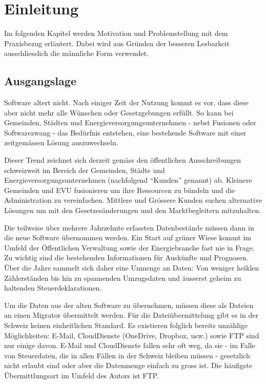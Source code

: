\chapter{Einleitung}
Im folgenden Kapitel werden Motivation und Problemstellung mit dem Praxisbezug erläutert. 
Dabei wird aus Gründen der besseren Lesbarkeit ausschliesslich 
die männliche Form verwendet.

\section{Ausgangslage}
Software altert nicht. Nach einiger Zeit der Nutzung kommt es vor, dass diese aber nicht mehr alle Wünschen oder Gesetzgebungen erfüllt.
So kann bei Gemeinden, Städten und Energieversorgungsunternehmen - nebst Fusionen oder Softwarezwang - das Bedürfnis entstehen, 
eine bestehende Software mit einer zeitgemässen Lösung auszuwechseln.   

Dieser Trend zeichnet sich derzeit gemäss den öffentlichen Ausschreibungen schweizweit im Bereich der Gemeinden, Städte und Energieversorgungsunternehmen 
(nachfolgend ``Kunden'' genannt) ab. 
Kleinere Gemeinden und EVU fusionieren um ihre Ressourcen zu bündeln und die Administration zu vereinfachen. 
Mittlere und Grössere Kunden suchen alternative Lösungen um mit den Gesetzesänderungen und den Marktbegleitern mitzuhalten.  

Die teilweise über mehrere Jahrzehnte erfassten Datenbestände müssen dann in die neue Software übernommen werden. 
Ein Start auf grüner Wiese kommt im Umfeld der Öffentlichen Verwaltung sowie der Energiebranche fast nie in Frage. 
Zu wichtig sind die bestehenden Informationen für Auskünfte und Prognosen. 
Über die Jahre sammelt sich daher eine Unmenge an Daten: 
Von weniger heiklen Zählerständen bis hin zu spannenden Umzugsdaten und äusserst geheim zu haltenden Steuerdeklarationen. 

Um die Daten aus der alten Software zu übernehmen, müssen diese als Dateien an einen Migrator übermittelt werden. 
Für die Dateiübermittelung gibt es in der Schweiz keinen einheitlichen Standard. 
Es existieren folglich bereits unzählige Möglichkeiten: E-Mail, CloudDienste (OneDrive, Dropbox, usw.) sowie FTP sind nur 
einige davon. E-Mail und CloudDienste fallen sehr oft weg, da sie - im Falle von Steuerdaten, 
die in allen Fällen in der Schweiz bleiben müssen - gesetzlich nicht erlaubt sind oder aber die Datenmenge einfach zu gross ist. 
Die häufigste Übermittlungsart im Umfeld des Autors ist FTP. 

